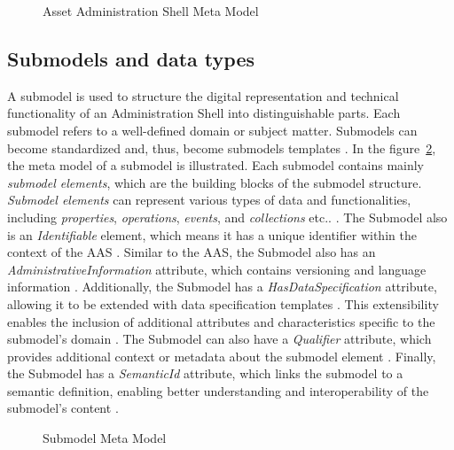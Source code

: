 \begin{figure}[p]
    \centering
    
    \caption{Asset Administration Shell Meta Model \cite{plattformi40_aas_part1_v3}}
    \label{fig:AAS_MetaModel}
\end{figure}
\newpage

\subsection{Submodels and data types}
A submodel is used to structure the digital representation and technical
functionality of an Administration Shell into distinguishable parts. Each submodel
refers to a well-defined domain or subject matter. Submodels can become
standardized and, thus, become submodels templates \cite{plattformi40_aas_part1_v3}.
In the figure~\ref{fig:Submodel_MetaModel}, the meta model of a submodel is illustrated.
Each submodel contains mainly \textit{submodel elements}, which are the building blocks of the submodel structure.
\textit{Submodel elements} can represent various types of data and functionalities,
including \textit{properties}, \textit{operations}, \textit{events}, and \textit{collections} etc.. \cite{plattformi40_aas_part1_v3}.
The Submodel also is an \textit{Identifiable} element, which means it has a unique identifier within the context of the \ac{AAS} \cite{plattformi40_aas_part1_v3}.
Similar to the \ac{AAS}, the Submodel also has an \textit{AdministrativeInformation} attribute,
which contains versioning and language information \cite{plattformi40_aas_part1_v3}.
Additionally, the Submodel has a \textit{HasDataSpecification} attribute, allowing it to be extended with data specification templates \cite{plattformi40_aas_part1_v3}.
This extensibility enables the inclusion of additional attributes and characteristics specific to the submodel's domain \cite{plattformi40_aas_part1_v3}.
The Submodel can also have a \textit{Qualifier} attribute, which provides additional context or metadata about the submodel element \cite{plattformi40_aas_part1_v3}.
Finally, the Submodel has a \textit{SemanticId} attribute, which links the submodel to a semantic definition,
enabling better understanding and interoperability of the submodel's content \cite{plattformi40_aas_part1_v3}.

\begin{figure}[p]
    \centering
    
    \caption{Submodel Meta Model \cite{plattformi40_aas_part1_v3}}
    \label{fig:Submodel_MetaModel}
\end{figure}

